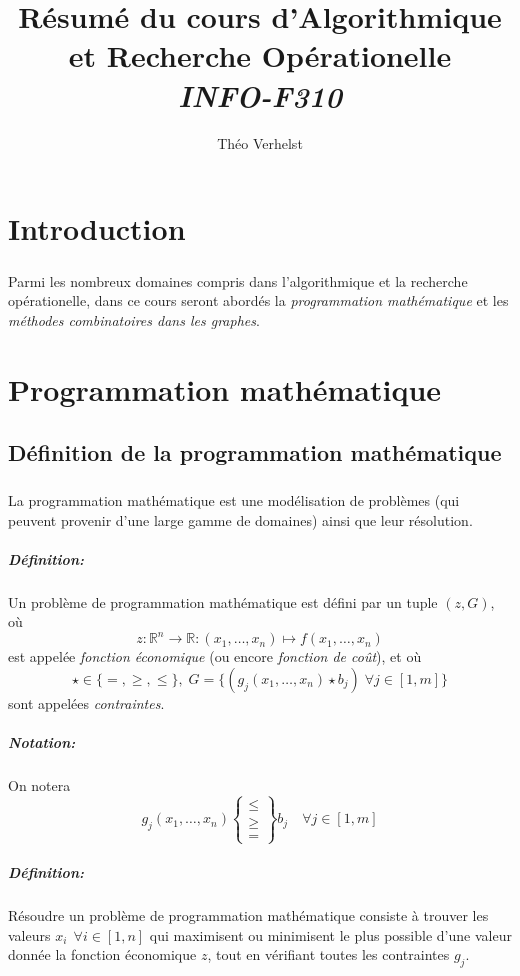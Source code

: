 \documentclass[a4paper]{report}
\author{Théo Verhelst}
\title{Résumé du cours d'Algorithmique et Recherche Opérationelle\\
\emph{INFO-F310}}
\begin{document}
\maketitle
\tableofcontents

\chapter{Introduction}
\paragraph{}
Parmi les nombreux domaines compris dans l'algorithmique et la recherche
opérationelle, dans ce cours seront abordés la \emph{programmation mathématique}
et les \emph{méthodes combinatoires dans les graphes}.

\chapter{Programmation mathématique}
\section{Définition de la programmation mathématique}
\paragraph{}
La programmation mathématique est une modélisation de problèmes (qui peuvent
provenir d'une large gamme de domaines) ainsi que leur résolution.
\paragraph{Définition:} Un problème de programmation mathématique est défini
par un tuple \((z, G)\), où
\[z:\mathbb{R}^n\to\mathbb{R}:(x_1,\dots,x_n)\mapsto f(x_1,\dots,x_n)\]
est appelée \emph{fonction économique} (ou encore \emph{fonction de coût}), et
où \[\star\in\{=,\ge,\le\},\;G=\{(g_j(x_1,\dots,x_n)\star b_j)\;\forall j\in[1,m]\}\]
sont appelées \emph{contraintes}.
\paragraph{Notation:}On notera
\[g_j(x_1,\dots,x_n)\begin{Bmatrix}\le\\\ge\\=\end{Bmatrix}b_j\quad\forall j\in[1,m]\]
\paragraph{Définition:}
Résoudre un problème de programmation mathématique consiste à trouver les
valeurs \(x_i\;\,\forall i\in[1,n]\) qui maximisent ou minimisent le plus
possible d'une valeur donnée la fonction économique \(z\),
tout en vérifiant toutes les contraintes \(g_j\).
\end{document}

